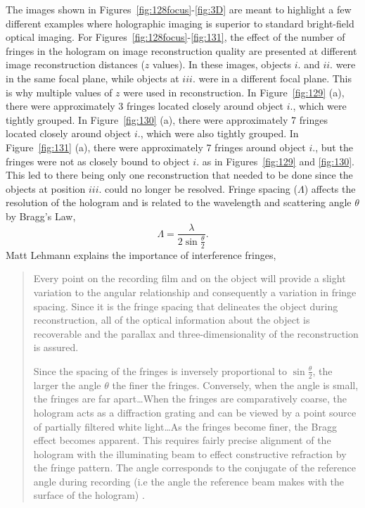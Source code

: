 The images shown in Figures~\ref{fig:128focus}-\ref{fig:3D} are meant to highlight a few different
examples where holographic imaging is superior to standard bright-field optical
imaging.
For Figures~\ref{fig:128focus}-\ref{fig:131}, the effect of the number of fringes in the hologram
on image reconstruction quality are presented at different image reconstruction
distances ($z$ values).
In these images,
objects $i.$ and $ii.$ were in the same focal plane, while objects at $iii.$
were in
a different focal plane. This is why multiple values of $z$ were used in
reconstruction. In Figure~\ref{fig:129} (a), there were approximately 3 fringes
located closely around object $i.$, which were tightly grouped. In
Figure~\ref{fig:130} (a), there were approximately 7 fringes
located closely around object $i.$, which were also tightly grouped. In
Figure~\ref{fig:131} (a), there were approximately 7 fringes around object
$i.$, but the fringes were not as closely bound to object $i.$ as in
Figures~\ref{fig:129} and \ref{fig:130}. This led to there being only one
reconstruction that needed to be done since the objects at position $iii.$
could no longer be resolved. Fringe spacing ($\Lambda$) affects the resolution of the
hologram and is related to the wavelength and scattering angle $\theta$
by Bragg's Law,
\begin{equation}
    \Lambda = \frac{\lambda}{2\sin{\frac{\theta}{2}}} .
\end{equation}
Matt Lehmann explains the importance of interference fringes,
\begin{quote}
Every point on the recording film and on the object will provide a
slight variation to the angular relationship and consequently a variation
in fringe spacing. Since it is the fringe spacing that delineates
the object
during reconstruction, all of the optical information about the object is
recoverable and the parallax and three-dimensionality of the
reconstruction is assured.

Since the spacing of the fringes is inversely proportional to
$\sin{\frac{\theta}{2}}$, the larger the angle $\theta$ the finer the fringes.
Conversely, when the angle is small, the fringes are far apart\ldots When the
fringes are comparatively coarse, the hologram acts as a diffraction grating
and can be viewed by a point source of partially filtered white light\ldots As
the fringes become finer, the Bragg effect becomes apparent. This requires
fairly precise alignment of the hologram with the illuminating beam to effect
constructive refraction by the fringe pattern. The angle corresponds to the
conjugate of the reference angle during recording (i.e the angle the reference
beam makes with the surface of the hologram) \cite{Lehmann}.
\end{quote}
